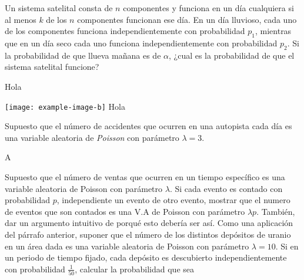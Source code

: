 \documentclass[11pt,answers,addpoints,a4paper,tittlepage=true,DIV=15,headsepline]{kommaexam}%
\theoremstyle{definition}
\begin{document}
\begin{questions}
\begin{solutionorbox}
	\end{solutionorbox}
	
	\question%
	Un sistema satelital consta de $n$ componentes y funciona en un día cualquiera si al menos $k$ de los $n$ componentes funcionan ese día. En un día lluvioso, cada uno de los componentes funciona independientemente con probabilidad $p_1$, mientras que en un día seco cada uno funciona independientemente con probabilidad $p_2$. Si la probabilidad de
	que llueva mañana es de $\alpha$, ¿cual es la probabilidad de que el sistema satelital funcione?
	\begin{solutionorlines}
	Hola
	
	\texttt{[image: example-image-b]}
	\centering
	\label{fig:lovely}
	\justifying
	Hola
	\end{solutionorlines}
	\question%
	Supuesto que el número de accidentes que ocurren en una autopista cada día es una variable aleatoria de \emph{Poisson} con parámetro $\lambda=3$.
	\begin{solutionordottedlines}
	A
	\end{solutionordottedlines}
	\nocolorsolutionboxes
	\question%
	Supuesto que el número de ventas que ocurren en un tiempo específico es una variable aleatoria de Poisson con parámetro $\lambda$. Si cada evento es contado con probabilidad $p$, independiente un evento de otro evento, mostrar que el numero de eventos que son contados es una V.A de Poisson con parámetro $\lambda p$. También, dar un argumento intuitivo de porqué esto debería ser así. Como una aplicación del párrafo anterior, suponer que el número de los distintos depósitos de uranio en un área dada es una variable aleatoria de Poisson con parámetro $\lambda=10$. Si en un periodo de tiempo fijado, cada depósito es descubierto independientemente con probabilidad $\tfrac{1}{50}$, calcular la probabilidad que sea
\end{questions}
\end{document}
